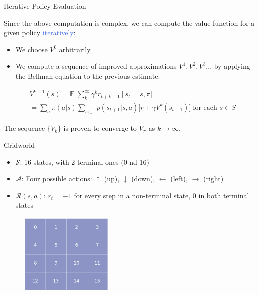\documentclass{beamer}
\begin{document}
\begin{frame}{Iterative Policy Evaluation}

Since the above computation is complex, we can compute the value function for a given policy \textcolor{RoyalBlue}{iteratively}:
\begin{itemize}
    \item We choose $V^0$ arbitrarily
    \item We compute a sequence of improved approximations $V^1, V^2, V^3 ...$  by applying the Bellman equation to the previous estimate:
\end{itemize}

\begin{align*}
    &V^{k+1}(s) = \mathds{E} \bigg[\sum_{k}^{\infty}\gamma^{k} r_{t+k+1} \: \bigg| \: s_t=s,\pi \bigg] \\
		   & = \sum_a \pi(a|s) \sum_{s_{t+1}} p(s_{t+1}|s,a)\big[r + \gamma V^{k}(s_{t+1}) \big] \; \text{for each } s \in S
\end{align*}

The sequence $\{V_k\}$ is proven to converge to $V_{\pi}$ as $k \rightarrow \infty $.

\end{frame}



\begin{frame}{Gridworld}

\begin{itemize}
    \item $\mathcal{S}$: 16 states, with 2 terminal ones (0 nd 16)
    \item $\mathcal{A}$: Four possible actions: $\uparrow$ (up), $\downarrow$ (down), $\leftarrow$ (left), $\rightarrow$ (right)
\item $\mathcal{R}(s,a)$: $r_t = -1$ for every step in a non-terminal state, 0 in both terminal states
\end{itemize}

\begin{figure}[t]
\includegraphics[width=4.5cm]{./images/GridWorld.png}
\centering
\end{figure}


\end{frame}
\end{document}
